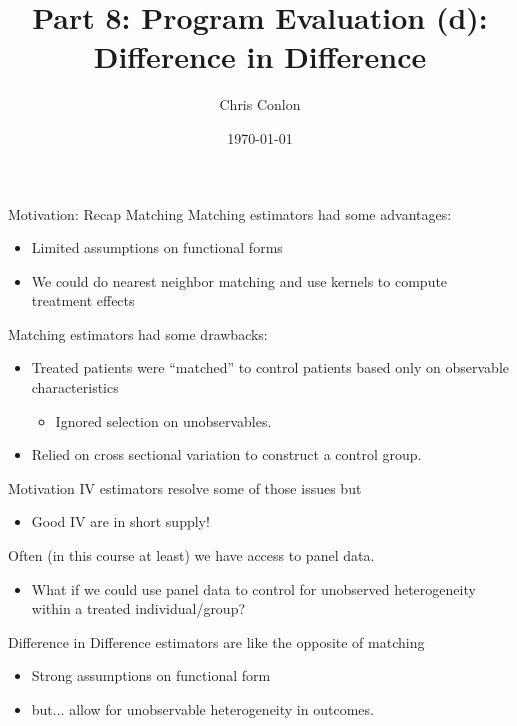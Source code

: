 


\title{Part 8: Program Evaluation (d): \\
 Difference in Difference}
\author{Chris Conlon}
\date{\today}

\frame{\titlepage}

\begin{frame}{Motivation: Recap Matching}
Matching estimators had some advantages:
\begin{itemize}
\item Limited assumptions on \alert{functional forms}
\item We could do nearest neighbor matching and use kernels to compute treatment effects
\end{itemize}
Matching estimators had some drawbacks:
\begin{itemize}
\item Treated patients were ``matched'' to control patients based only on \alert{observable characteristics}
\begin{itemize}
\item Ignored \alert{selection on unobservables}.
\end{itemize}
\item Relied on \alert{cross sectional} variation to construct a control group.
\end{itemize}
\end{frame}


\begin{frame}{Motivation}
IV estimators resolve some of those issues but
\begin{itemize}
\item Good IV are in short supply!
\end{itemize}
 Often (in this course at least) we have access to \alert{panel data}.
\begin{itemize}
\item What if we could use panel data to control for \alert{unobserved heterogeneity} within a treated individual/group?
\end{itemize}
\alert{Difference in Difference} estimators are like the opposite of matching
\begin{itemize}
\item \alert{Strong} assumptions on \alert{functional form}
\item but... allow for \alert{unobservable heterogeneity} in outcomes.
\end{itemize}
\end{frame}


